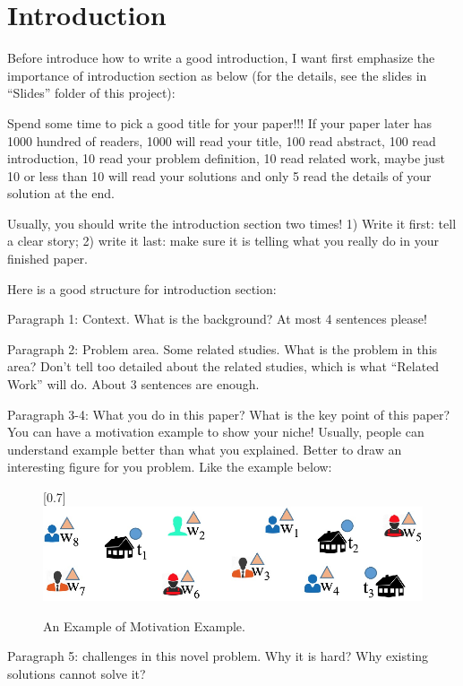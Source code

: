 \section{Introduction}

Before introduce how to write a good introduction, I want first emphasize the importance of introduction section as below (for the details, see the slides in ``Slides'' folder of this project):

Spend some time to pick a good title for your paper!!! If your paper later has 1000 hundred of readers, 1000 will read your title, 100 read abstract, 100 read introduction, 10 read your problem definition, 10 read related work, maybe just 10 or less than 10 will read your solutions and only 5 read the details of your solution at the end.


Usually, you should write the introduction section two times! 1) Write it first: tell a clear story; 2) write it last: make sure it is telling what you really do in your finished paper.

Here is a good structure for introduction section:

Paragraph 1: Context. What is the background? At most 4 sentences please!

Paragraph 2: Problem area. Some related studies. What is the problem in this area? Don't tell too detailed about the related studies, which is what ``Related Work'' will do.  About 3 sentences are enough.

Paragraph 3-4: What you do in this paper? What is the key point of this paper? You can have a motivation example to show your niche! Usually, people can understand example better than what you explained. Better to draw an interesting figure for you problem. Like the example \cite{cheng2016task} below:

\begin{figure}[h!]\centering
	\scalebox{0.7}[0.7]{\includegraphics{../figures/motivation_example.eps}}
	\caption{\small An Example of Motivation Example.}
	\label{fig:bbq_example}
\end{figure}

Paragraph 5: challenges in this novel problem. Why it is hard? Why existing solutions cannot solve it?

